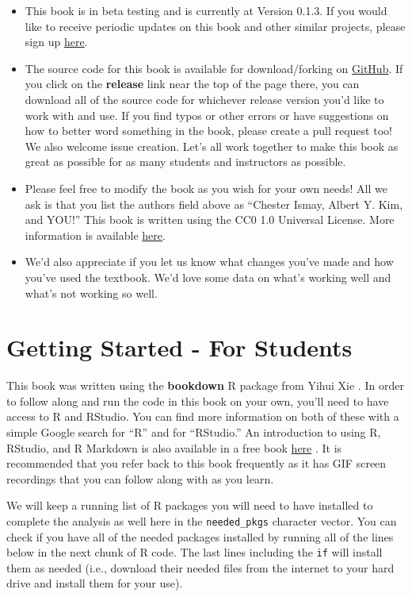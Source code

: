 \documentclass[]{tufte-book}
\providecommand{\tightlist}{%
  \setlength{\itemsep}{0pt}\setlength{\parskip}{0pt}}
\begin{document}
\begin{itemize}
\tightlist
\item
  This book is in beta testing and is currently at Version 0.1.3. If you
  would like to receive periodic updates on this book and other similar
  projects, please sign up \href{http://eepurl.com/cBkItf}{here}.
\item
  The source code for this book is available for download/forking on
  \href{https://github.com/ismayc/moderndiver-book}{GitHub}. If you
  click on the \textbf{release} link near the top of the page there, you
  can download all of the source code for whichever release version
  you'd like to work with and use. If you find typos or other errors or
  have suggestions on how to better word something in the book, please
  create a pull request too! We also welcome issue creation. Let's all
  work together to make this book as great as possible for as many
  students and instructors as possible.
\item
  Please feel free to modify the book as you wish for your own needs!
  All we ask is that you list the authors field above as ``Chester
  Ismay, Albert Y. Kim, and YOU!'' This book is written using the CC0
  1.0 Universal License. More information is available
  \href{https://creativecommons.org/publicdomain/zero/1.0/}{here}.
\item
  We'd also appreciate if you let us know what changes you've made and
  how you've used the textbook. We'd love some data on what's working
  well and what's not working so well.
\end{itemize}

\section{Getting Started - For
Students}\label{getting-started---for-students}

This book was written using the \textbf{bookdown} R package from Yihui
Xie \citep{R-bookdown}. In order to follow along and run the code in
this book on your own, you'll need to have access to R and RStudio. You
can find more information on both of these with a simple Google search
for ``R'' and for ``RStudio.'' An introduction to using R, RStudio, and
R Markdown is also available in a free book
\href{http://ismayc.github.io/rbasics-book}{here} \citep{usedtor2016}.
It is recommended that you refer back to this book frequently as it has
GIF screen recordings that you can follow along with as you learn.

We will keep a running list of R packages you will need to have
installed to complete the analysis as well here in the
\texttt{needed\_pkgs} character vector. You can check if you have all of
the needed packages installed by running all of the lines below in the
next chunk of R code. The last lines including the \texttt{if} will
install them as needed (i.e., download their needed files from the
internet to your hard drive and install them for your use).
\end{document}
